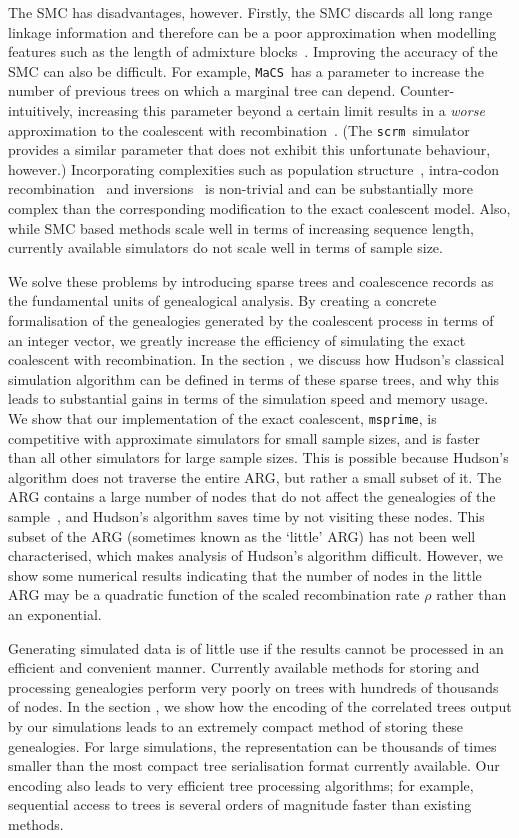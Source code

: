 \documentclass[10pt,letterpaper]{article}
\newcommand{\msprime}[0]{\texttt{msprime}}
\newcommand{\scrm}[0]{\texttt{scrm}}
\newcommand{\MaCS}[0]{\texttt{MaCS}}
\begin{document}
The SMC has disadvantages, however. Firstly, the SMC discards all long range
linkage information and therefore can be a poor approximation when modelling
features such as the length of admixture blocks~\citep{ln14}.  Improving the
accuracy of the SMC can also be difficult.
For example, \MaCS\ has a parameter to increase the
number of previous trees on which a marginal tree can depend.
Counter-intuitively, increasing this parameter beyond a certain limit
results in a \emph{worse} approximation to the coalescent with
recombination~\citep{szml14}. (The \scrm\ simulator
provides a similar parameter that does not exhibit this unfortunate
behaviour, however.)
Incorporating complexities such as population structure~\citep{emm09},
intra-codon recombination~\citep{ap10} and inversions~\citep{pkgk13} is
non-trivial and can be substantially more complex than the corresponding
modification to the exact coalescent model. Also, while SMC based methods scale
well in terms of increasing sequence length, currently available simulators do
not scale well in terms of sample size.

We solve these problems by introducing sparse trees and coalescence records as
the fundamental units of genealogical analysis. By creating a concrete
formalisation of the genealogies generated by the coalescent process in terms
of an integer vector, we greatly increase the efficiency of simulating the
exact coalescent with recombination. In the section \textbf{},
we
discuss how Hudson's classical simulation algorithm can be defined in terms of
these sparse trees, and why this leads to substantial gains in terms of the
simulation speed and memory usage. We show that our implementation of the exact
coalescent, \msprime, is competitive with approximate simulators for small
sample sizes, and is faster than all other simulators for large sample sizes.
This is possible because Hudson's algorithm does not traverse the entire ARG,
but rather a small subset of it. The ARG contains a large number of nodes that
do not affect the genealogies of the sample~\cite{wh99}, and Hudson's algorithm saves time
by not visiting these nodes. This subset of the ARG (sometimes known as the
`little' ARG) has not been well characterised, which makes
analysis of Hudson's algorithm difficult. However, we show some numerical
results indicating that the number of nodes in the little ARG may be a quadratic
function of the scaled recombination rate $\rho$ rather than an exponential.

Generating simulated data is of little use if the results cannot be processed
in an efficient and convenient manner. Currently available methods for storing
and processing genealogies perform very poorly on trees with hundreds of thousands of
nodes. In the section \textbf{}, we show how the encoding of the
correlated trees output by our simulations leads
to an extremely compact method of storing these genealogies. For large
simulations, the representation can be thousands of times smaller than the most
compact tree serialisation format currently available. Our encoding also leads
to very efficient tree processing algorithms; for example, sequential access to
trees is several orders of magnitude faster than existing methods.
\end{document}
